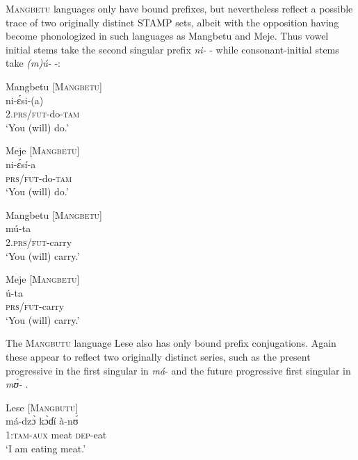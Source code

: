 \documentclass[output=paper]{langsci/langscibook}
\begin{document}
\textsc{Mangbetu} languages only have bound prefixes, but nevertheless reflect a possible trace of two originally distinct STAMP sets, albeit with the opposition having become phonologized in such languages as Mangbetu and Meje. Thus vowel initial stems take the second singular prefix \textit{ni-} - while consonant-initial stems take \textit{(m)ú-} -:


\newcommand{\andersonE}{\'{ɛ}}
\ea\label{ex:anderson:60}
Mangbetu \citep[106]{Larochette1958}        \textsc{[Mangbetu]}\\
\gll ni-{\andersonE}si-(a)      \\
2.\textsc{prs/fut}-do-\textsc{tam}        \\
\glt `You (will) do.' 
\z

\ea\label{ex:anderson:61}
Meje \citep[106]{Larochette1958}           \textsc{[Mangbetu]}\\
\gll ni-{\andersonE}sí-a\\
\textsc{prs/fut}-do-\textsc{tam}\\
\glt `You (will) do.' 
\z

\ea\label{ex:anderson:62}
Mangbetu \citep[106-7]{Larochette1958}        \textsc{[Mangbetu]}\\
\gll mú-ta\\
2.\textsc{prs/fut}-carry    \\
\glt `You (will) carry.'     
\z

\ea\label{ex:anderson:63}
Meje \citep[106-7]{Larochette1958}        \textsc{[Mangbetu]}\\
\gll ú-ta\\
\textsc{prs/fut}-carry\\
\glt `You (will) carry.' 
\z

The \textsc{Mangbutu} language Lese also has only bound prefix conjugations. Again these appear to reflect two originally distinct series, such as the present progressive in the first singular in \textit{má}-  and the future progressive first singular in \textit{m\'ʊ-} .

\ea\label{ex:anderson:64}
Lese \citep[51]{TuckerBryan1966}        \textsc{[Mangbutu]}\\
\gll má-dz\`ɔ    k\`ɔɗí  à-n\'ʊ   \\
1:\textsc{tam-aux}  meat  \textsc{dep}-eat   \\
\glt `I am eating meat.'   
\z
\end{document}
